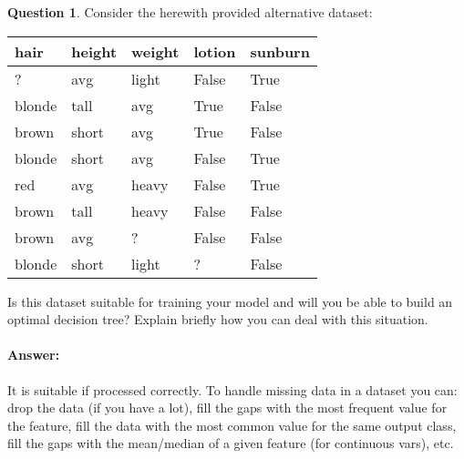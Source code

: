 \documentclass[11pt,a4paper]{article}
\theoremstyle{definition}%
\newtheorem{Q}{Question}[] %
\newcommand{\reponse}[1]{%
\ifthenelse {\boolean{corrige}} {\paragraph{Answer:} \color{darkblue}   #1\color{black}} {}
}
\begin{document}
\begin{Q}
    Consider the herewith provided alternative dataset:
    \begin{center}
\begin{tabular}{|l|l|l|l|l|}
\hline
\textbf{hair} & \textbf{height} & \textbf{weight} & \textbf{lotion} & \textbf{sunburn} \\ \hline
?             & avg             & light           & False           & True             \\ \hline
blonde        & tall            & avg             & True            & False            \\ \hline
brown         & short           & avg             & True            & False            \\ \hline
blonde        & short           & avg             & False           & True             \\ \hline
red           & avg             & heavy           & False           & True             \\ \hline
brown         & tall            & heavy           & False           & False            \\ \hline
brown         & avg             & ?               & False           & False            \\ \hline
blonde        & short           & light           & ?               & False            \\ \hline
\end{tabular}
    \end{center}
    Is this dataset suitable for training your model and will you be able to build an optimal decision
    tree? Explain briefly how you can deal with this situation.

    \reponse{
        It is suitable if processed correctly. To handle missing data in a dataset you can: 
        drop the data (if you have a lot), fill the gaps with the most frequent value for the feature,
        fill the data with the most common value for the same output class,
        fill the gaps with the mean/median of a given feature (for continuous vars), etc. 
    }
\end{Q}
\end{document}
